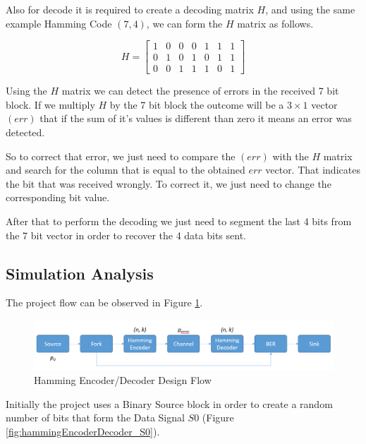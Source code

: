 \begin{refsection}
Also for decode it is required to create a decoding matrix $H$, and using the same example Hamming Code $(7, 4)$, we can form the $H$ matrix as follows.

\begin{equation}
H = \begin{bmatrix}
1 & 0 & 0 & 0 & 1 & 1 & 1 \\ 
0 & 1 & 0 & 1 & 0 & 1 & 1 \\ 
0 & 0 & 1 & 1 & 1 & 0 & 1
\end{bmatrix}
\end{equation}

Using the $H$ matrix we can detect the presence of errors in the received 7 bit block. If we multiply $H$ by the 7 bit block the outcome will be a $3 \times 1$ vector $(err)$ that if the sum of it's values is different than zero it means an error was detected.

So to correct that error, we just need to compare the $(err)$ with the $H$ matrix and search for the column that is equal to the obtained $err$ vector. That indicates the bit that was received wrongly. To correct it, we just need to change the corresponding bit value.

After that to perform the decoding we just need to segment the last 4 bits from the 7 bit vector in order to recover the 4 data bits sent.

\subsection{Simulation Analysis}

The project flow can be observed in Figure \ref{fig:hammingEncoderDecoder}.

\begin{figure}[h!]
	\centering
	\includegraphics[width=.9\linewidth]{./sdf/eit_25828_hamming_channel_encoder_decoder/images/blockDesign.png}
	\caption{Hamming Encoder/Decoder Design Flow}
	\label{fig:hammingEncoderDecoder}
\end{figure}

Initially the project uses a Binary Source block in order to create a random number of bits that form the Data Signal $S0$ (Figure \ref{fig:hammingEncoderDecoder_S0}).


\end{refsection}
